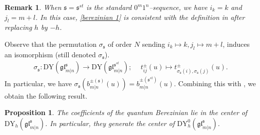 \documentclass[a4paper,12pt]{article}
\newtheorem{rema}[theo]{Remark}
\newtheorem{prop}[theo]{Proposition}
\numberwithin{equation}{section}
\begin{document}
\begin{rema}
When $\mathfrak{s}=\mathfrak{s}^{st}$ is the standard $0^{m}1^{n}$--sequence, we have $i_{k}=k$ and $j_{l}=m+l$. In this case, \eqref{berezinian 1} is consistent with the definition in \cite{BK25-1} after replacing $h$ by $-h$.
\end{rema}

Observe that the permutation $\sigma_{\mathfrak{s}}$ of order $N$ sending $i_{k}\mapsto k, j_{l}\mapsto m+l$, induces an isomorphism (still denoted $\sigma_{\mathfrak{s}}$).
\begin{align*}
\sigma_{\mathfrak{s}}: \mathrm{DY}(\mathfrak{gl}_{m|n}^{\mathfrak{s}})\rightarrow \mathrm{DY}(\mathfrak{gl}_{m|n}^{\mathfrak{s}^{st}});\quad~
t_{ij}^{\pm }(u)\mapsto t_{\sigma_{\mathfrak{s}}(i),\sigma_{\mathfrak{s}}(j)}^{\pm }(u).
\end{align*}
In particular, we have $\sigma_{\mathfrak{s}}\left(b_{m|n}^{\pm (\mathfrak{s})}(u)\right)=b_{m|n}^{\pm (\mathfrak{s}^{st})}(u)$. Combining this with \cite[Theorem 3.10]{BK25-1}, we obtain the following result.

\begin{prop}
The coefficients of the quantum Berezinian lie in the center of~ $\mathrm{DY}_{h}(\mathfrak{gl}_{m|n}^{\mathfrak{s}})$. In particular, they generate the center of $\mathrm{DY}_{h}^{0}(\mathfrak{gl}_{m|n}^{\mathfrak{s}})$.
\end{prop}
\end{document}

